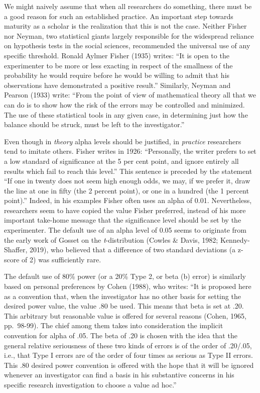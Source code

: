 \documentclass[
  english,
  ,jou, a4paper,floatsintext]{apa6}
\begin{document}
We might naively assume that when all researchers do something, there must be a good reason for such an established practice. An important step towards maturity as a scholar is the realization that this is not the case. Neither Fisher nor Neyman, two statistical giants largely responsible for the widespread reliance on hypothesis tests in the social sciences, recommended the universal use of any specific threshold. Ronald Aylmer Fisher (1935) writes: ``It is open to the experimenter to be more or less exacting in respect of the smallness of the probability he would require before he would be willing to admit that his observations have demonstrated a positive result.'' Similarly, Neyman and Pearson (1933) write: ``From the point of view of mathematical theory all that we can do is to show how the risk of the errors may be controlled and minimized. The use of these statistical tools in any given case, in determining just how the balance should be struck, must be left to the investigator.''

Even though in \emph{theory} alpha levels should be justified, in \emph{practice} researchers tend to imitate others. Fisher writes in 1926: ``Personally, the writer prefers to set a low standard of significance at the 5 per cent point, and ignore entirely all results which fail to reach this level.'' This sentence is preceded by the statement ``If one in twenty does not seem high enough odds, we may, if we prefer it, draw the line at one in fifty (the 2 percent point), or one in a hundred (the 1 percent point).'' Indeed, in his examples Fisher often uses an alpha of 0.01. Nevertheless, researchers seem to have copied the value Fisher preferred, instead of his more important take-home message that the significance level should be set by the experimenter. The default use of an alpha level of 0.05 seems to originate from the early work of Gosset on the \emph{t}-distribution (Cowles \& Davis, 1982; Kennedy-Shaffer, 2019), who believed that a difference of two standard deviations (a z-score of 2) was sufficiently rare.

The default use of 80\% power (or a 20\% Type 2, or beta (b) error) is similarly based on personal preferences by Cohen (1988), who writes: ``It is proposed here as a convention that, when the investigator has no other basis for setting the desired power value, the value .80 be used. This means that beta is set at .20. This arbitrary but reasonable value is offered for several reasons (Cohen, 1965, pp.~98-99). The chief among them takes into consideration the implicit convention for alpha of .05. The beta of .20 is chosen with the idea that the general relative seriousness of these two kinds of errors is of the order of .20/.05, i.e., that Type I errors are of the order of four times as serious as Type II errors. This .80 desired power convention is offered with the hope that it will be ignored whenever an investigator can find a basis in his substantive concerns in his specific research investigation to choose a value ad hoc.''
\end{document}

